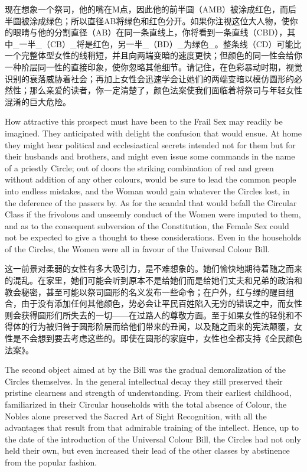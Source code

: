 \documentclass[12pt,UTF8]{ctexbook}
\begin{document}
现在想象一个祭司，他的嘴在M点，因此他的前半圆（AMB）被涂成红色，而后半圆被涂成绿色；所以直径AB将绿色和红色分开。如果你注视这位大人物，使你的眼睛与他的分割直径（AB）在同一条直线上，你将看到一条直线（CBD），其中\_一半\_（CB）\_将是红色，另一半\_（BD）\_为绿色\_。整条线（CD）可能比一个完整体型女性的线稍短，并且向两端变暗的速度更快；但颜色的同一性会给你一种阶层同一性的直接印象，使你忽略其他细节。请记住，在色彩暴动时期，视觉识别的衰落威胁着社会；再加上女性会迅速学会让她们的两端变暗以模仿圆形的必然性；那么亲爱的读者，你一定清楚了，颜色法案使我们面临着将祭司与年轻女性混淆的巨大危险。

How attractive this prospect must have been to the Frail Sex may readily be imagined. They anticipated with delight the confusion that would ensue. At home they might hear political and ecclesiastical secrets intended not for them but for their husbands and brothers, and might even issue some commands in the name of a priestly Circle; out of doors the striking combination of red and green without addition of any other colours, would be sure to lead the common people into endless mistakes, and the Woman would gain whatever the Circles lost, in the deference of the passers by. As for the scandal that would befall the Circular Class if the frivolous and unseemly conduct of the Women were imputed to them, and as to the consequent subversion of the Constitution, the Female Sex could not be expected to give a thought to these considerations. Even in the households of the Circles, the Women were all in favour of the Universal Colour Bill.

这一前景对柔弱的女性有多大吸引力，是不难想象的。她们愉快地期待着随之而来的混乱。在家里，她们可能会听到原本不是给她们而是给她们丈夫和兄弟的政治和教会秘密，甚至可能以祭司圆形的名义发布一些命令；在户外，红与绿的醒目组合，由于没有添加任何其他颜色，势必会让平民百姓陷入无穷的错误之中，而女性则会获得圆形们所失去的一切——在过路人的尊敬方面。至于如果女性的轻佻和不得体的行为被归咎于圆形阶层而给他们带来的丑闻，以及随之而来的宪法颠覆，女性是不会想到要去考虑这些的。即使在圆形的家庭中，女性也全都支持《全民颜色法案》。

The second object aimed at by the Bill was the gradual demoralization of the Circles themselves. In the general intellectual decay they still preserved their pristine clearness and strength of understanding. From their earliest childhood, familiarized in their Circular households with the total absence of Colour, the Nobles alone preserved the Sacred Art of Sight Recognition, with all the advantages that result from that admirable training of the intellect. Hence, up to the date of the introduction of the Universal Colour Bill, the Circles had not only held their own, but even increased their lead of the other classes by abstinence from the popular fashion.
\end{document}
